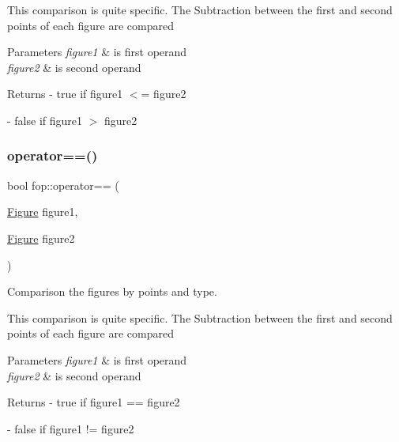 This comparison is quite specific. The Subtraction between the first and second points of each figure are compared 
\begin{DoxyParams}{Parameters}
{\em figure1} & is first operand \\
\hline
{\em figure2} & is second operand \\
\hline
\end{DoxyParams}
\begin{DoxyReturn}{Returns}
-\/ true if \textquotesingle{}figure1\textquotesingle{} $<$= \textquotesingle{}figure2\textquotesingle{} 

-\/ false if \textquotesingle{}figure1\textquotesingle{} $>$ \textquotesingle{}figure2\textquotesingle{} 
\end{DoxyReturn}
\mbox{\label{namespacefop_ad4c7032872695a09038ecc2d09fef5b8}} 
\subsubsection{\texorpdfstring{operator==()}{operator==()}}
{\footnotesize\ttfamily bool fop\+::operator== (\begin{DoxyParamCaption}\item[{\mbox{\hyperlink{classfop_1_1_figure}{Figure}}}]{figure1,  }\item[{\mbox{\hyperlink{classfop_1_1_figure}{Figure}}}]{figure2 }\end{DoxyParamCaption})}



Comparison the figures by points and type. 

This comparison is quite specific. The Subtraction between the first and second points of each figure are compared 
\begin{DoxyParams}{Parameters}
{\em figure1} & is first operand \\
\hline
{\em figure2} & is second operand \\
\hline
\end{DoxyParams}
\begin{DoxyReturn}{Returns}
-\/ true if \textquotesingle{}figure1\textquotesingle{} == \textquotesingle{}figure2\textquotesingle{} 

-\/ false if \textquotesingle{}figure1\textquotesingle{} != \textquotesingle{}figure2\textquotesingle{} 
\end{DoxyReturn}
\mbox{\label{namespacefop_a1e56aa53c205088fdeba5a4ff85b211f}} 
